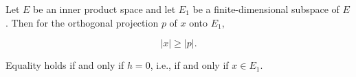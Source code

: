 Let \(E\) be an inner product space and let \(E_1\) be a finite-dimensional subspace of \(E\). Then for the orthogonal projection \(p\) of \(x\) onto \(E_1\),

$$|x| \geq |p|.$$

Equality holds if and only if \(h = 0\), i.e., if and only if \(x \in E_1\).
